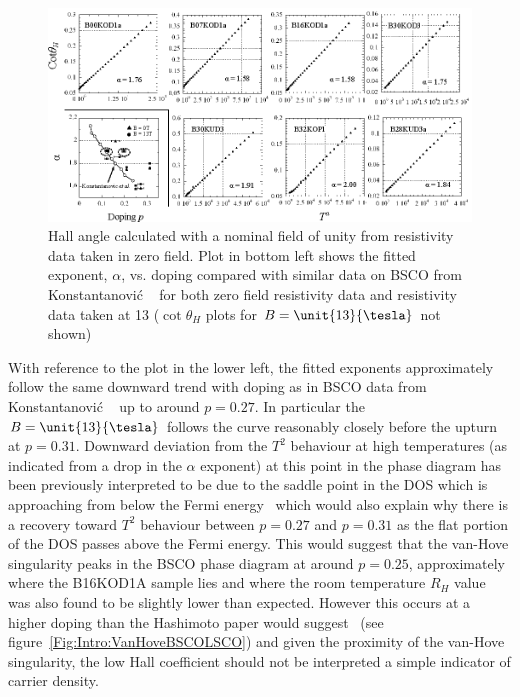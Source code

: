 \begin{figure}[htbp]
    \begin{center}
        \includegraphics[scale=1.1]{Chapter-HallBSCO/Figures/HallAngle/HallAngle}
        \caption{Hall angle calculated with a nominal field of unity from resistivity data taken in zero field. Plot in bottom left shows the fitted exponent, $\alpha$, vs. doping compared with similar data on \ac{BSCO} from Konstantanovi\'c \etal~\cite{Konstantinovic2000} for both zero field resistivity data and resistivity data taken at \unit{13}{\kelvin} ($\cot\theta_H$ plots for $B=\unit{13}{\tesla}$ not shown)}
        \label{Fig:ResH:HallAngle}
    \end{center}
\end{figure}
With reference to the plot in the lower left, the fitted exponents approximately follow the same downward trend with doping as in \ac{BSCO} data from Konstantanovi\'c \etal~\cite{Konstantinovic2000} up to around $p=0.27$. In particular the $B=\unit{13}{\tesla}$ follows the curve reasonably closely before the upturn at $p=0.31$. Downward deviation from the $T^2$ behaviour at high temperatures (as indicated from a drop in the $\alpha$ exponent) at this point in the phase diagram has been previously interpreted to be due to the saddle point in the \ac{DOS} which is approaching from below the Fermi energy~\cite{Ando2004} which would also explain why there is a recovery toward $T^2$ behaviour between $p=0.27$ and $p=0.31$ as the flat portion of the \ac{DOS} passes above the Fermi energy. This would suggest that the van-Hove singularity peaks in the \ac{BSCO} phase diagram at around $p=0.25$, approximately where the B16KOD1A sample lies and where the room temperature $R_H$ value was also found to be slightly lower than expected. However this occurs at a higher doping than the Hashimoto paper would suggest~\cite{Hashimoto2008} (see figure~\ref{Fig:Intro:VanHoveBSCOLSCO}) and given the proximity of the van-Hove singularity, the low Hall coefficient should not be interpreted a simple indicator of carrier density. 
